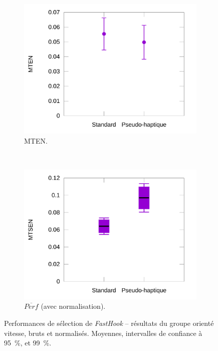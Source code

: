 \begin{figure}[htbp]
\begin{subfigure}[t]{0.49\textwidth}
			\includegraphics[width=\textwidth]{figures/ch5/phSpNormErrors}
			\caption{MTEN.}
			\label{fig:phSpNormErrors}
		\end{subfigure}
				~
		\begin{subfigure}[t]{0.49\textwidth}
			\centering
			\includegraphics[width=\textwidth]{figures/ch5/phSpNormProducts}
			\caption{$\overline{Perf}$ (avec normalisation).}
			\label{fig:phSpNormProducts}
		\end{subfigure}
		\caption[\emph{FastHook} -- résultats II]{Performances de sélection de \emph{FastHook} -- résultats du groupe orienté vitesse, bruts et normalisés. Moyennes, intervalles de confiance à 95~\%{}, et 99~\%{}.}
		\label{fig:fastHookSpRes}
	\end{figure}
	
